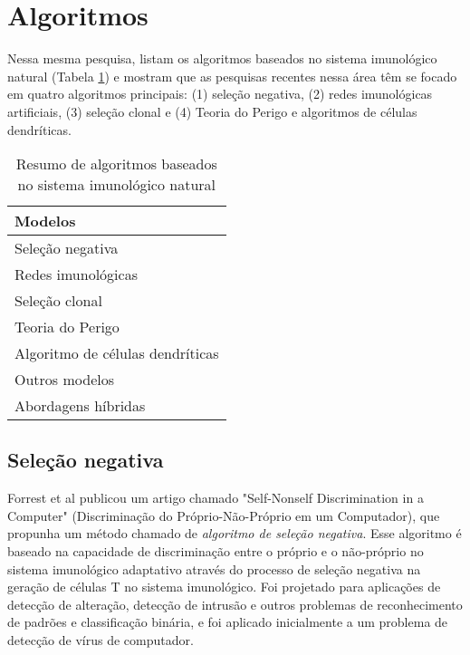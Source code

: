 \section{Algoritmos}

Nessa mesma pesquisa, \citeauthor{Dasgupta2010} listam os algoritmos baseados no sistema imunológico natural (Tabela \ref{nis-inspired-table}) e mostram que as pesquisas recentes nessa área têm se focado em quatro algoritmos principais: (1) seleção negativa, (2) redes imunológicas artificiais, (3) seleção clonal e (4) Teoria do Perigo e algoritmos de células dendríticas. 

\begin{table}[b]
    \centering
    \begin{tabular}{l}
        \hline
        Modelos                          \\
        \hline
        Seleção negativa                 \\
        Redes imunológicas               \\
        Seleção clonal                   \\
        Teoria do Perigo                 \\
        Algoritmo de células dendríticas \\
        Outros modelos                   \\
        Abordagens híbridas              \\
        \hline
    \end{tabular}
    \caption{Resumo de algoritmos baseados no sistema imunológico natural}
    \label{nis-inspired-table}
\end{table}

\subsection{Seleção negativa}

Forrest et al \cite{Forrest1994} publicou um artigo chamado "Self-Nonself Discrimination in a Computer" (Discriminação do Próprio-Não-Próprio em um Computador), que propunha um método chamado de \emph{algoritmo de seleção negativa}. Esse algoritmo é baseado na capacidade de discriminação entre o próprio e o não-próprio no sistema imunológico adaptativo através do processo de seleção negativa na geração de células T no sistema imunológico. Foi projetado para aplicações de detecção de alteração, detecção de intrusão e outros problemas de reconhecimento de padrões e classificação binária, e foi aplicado inicialmente a um problema de detecção de vírus de computador.

